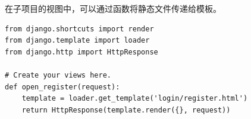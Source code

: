 在\textcolor{YBXPurple}{子项目}的视图中，可以通过函数将静态文件传递给模板。
\begin{lstlisting}[style=demostyle,numbers=none]
from django.shortcuts import render
from django.template import loader
from django.http import HttpResponse

# Create your views here.
def open_register(request):
    template = loader.get_template('login/register.html')
    return HttpResponse(template.render({}, request))
\end{lstlisting}






